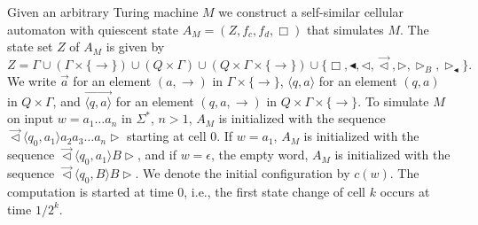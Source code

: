 \documentclass{article}
\theoremstyle{definition}
\begin{document}
Given an arbitrary Turing machine $M$ we construct a self-similar cellular automaton with quiescent state $A_M = (Z, f_c, f_d, \Box)$
that simulates $M$.
The state set $Z$ of $A_M$ is given by
\[
Z = \Gamma \cup (\Gamma \times \{\rightarrow\}) \cup (Q \times \Gamma)
\cup (Q \times \Gamma \times \{\rightarrow\}) \cup
\{\Box, \blacktriangleleft, \lhd, \overrightarrow{\lhd}, \rhd, \rhd_B, \rhd_\blacktriangleleft\}.
\]
We write $\overrightarrow{a}$ for an element $(a, \rightarrow)$ in $\Gamma \times \{\rightarrow\}$,
$\langle q,a \rangle$ for an element
$(q, a)$ in $Q \times \Gamma$, and
$\overrightarrow{\langle q,a \rangle}$ for an element
$(q, a, \rightarrow)$ in $Q \times \Gamma \times \{\rightarrow\}$.
To simulate $M$ on input $w=a_1 \ldots a_n$ in $\Sigma^*$, $n > 1$,
$A_M$ is initialized with the sequence
$\overrightarrow{\lhd} \langle q_0,a_1 \rangle a_2 a_3\ldots a_n\rhd $
starting at cell 0.
If $w=a_1$, $A_M$ is initialized with the sequence
$\overrightarrow{\lhd} \langle q_0,a_1 \rangle B\rhd $, and
if $w=\epsilon$, the empty word, $A_M$ is initialized with the sequence
$\overrightarrow{\lhd} \langle q_0,B \rangle B\rhd $.
We denote the initial configuration by $c(w)$.
The computation is started at time 0, i.e., the first state change of cell $k$ occurs at time $1/2^k$.
\end{document}
